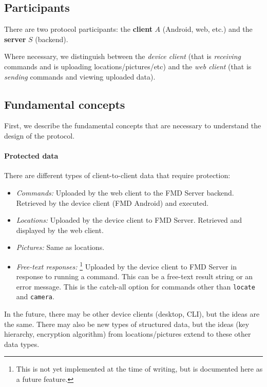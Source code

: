 \documentclass[11pt,a4paper]{article}
\begin{document}
\subsection{Participants}

There are two protocol participants: the \textbf{client} $A$ (Android, web, etc.)
and the \textbf{server} $S$ (backend).

Where necessary, we distinguish between the \emph{device client}
(that is \emph{receiving} commands and is uploading locations/pictures/etc)
and the \emph{web client} (that is \emph{sending} commands and viewing uploaded data).

\subsection{Fundamental concepts}

First, we describe the fundamental concepts that are necessary to understand the design of the protocol.

\paragraph{Protected data}
There are different types of client-to-client data that require protection:

\begin{itemize}
    \item \emph{Commands:}
        Uploaded by the web client to the FMD Server backend.
        Retrieved by the device client (FMD Android) and executed.
    \item \emph{Locations:}
        Uploaded by the device client to FMD Server.
        Retrieved and displayed by the web client.
    \item \emph{Pictures:} Same as locations.
    \item \emph{Free-text responses:}
        \footnote{This is not yet implemented at the time of writing, but is documented here as a future feature.}
        Uploaded by the device client to FMD Server
        in response to running a command.
        This can be a free-text result string or an error message.
        This is the catch-all option for commands other than \texttt{locate} and \texttt{camera}.
\end{itemize}

In the future, there may be other device clients (desktop, CLI), but the ideas are the same.
There may also be new types of structured data, but the ideas (key hierarchy, encryption algorithm)
from locations/pictures extend to these other data types.
\end{document}
